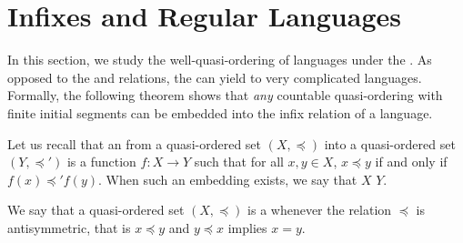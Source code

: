 \section{Infixes and Regular Languages}
\label{infixes-regular:sec}


In this section, we study the well-quasi-ordering of languages under the
. As opposed to the  and  relations,
the  can yield to very complicated 
languages. Formally, the following theorem shows that \emph{any} countable
quasi-ordering with finite initial segments can be embedded into the infix
relation of a language.

Let us recall that an  from a quasi-ordered set $(X,
\preceq)$ into a quasi-ordered set $(Y, \preceq')$ is a function $f \colon X
\to Y$ such that for all $x, y \in X$, $x \preceq y$ if and only if $f(x)
\preceq' f(y)$. When such an embedding exists, we say that $X$  $Y$.

We say that a quasi-ordered set $(X, \preceq)$ is a 
whenever the relation $\preceq$ is antisymmetric, that is $x \preceq y$ and $y
\preceq x$ implies $x = y$. 

